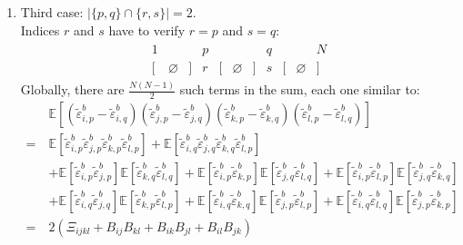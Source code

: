 \documentclass[12pt]{scrartcl}
\begin{document}
\begin{enumerate}
\item Third case: $|\{p,q\} \cap \{r,s\}| = 2$.\\
Indices $r$ and $s$ have to verify $r = p$ and $s = q$:
\begin{align}
\begin{array}{ccccccccccc}
1 & & & p & & & & q & & & N \\
\big[ & \varnothing & \big] & r & \big[ & \varnothing & \big] & s & \big[ & \varnothing & \big] \nonumber
\end{array}
\end{align}
Globally, there are $\displaystyle \frac{N(N-1)}{2}$ such terms in the sum, each one similar to:
\begin{align}
& \mathbb{E}\left[ \left(\widetilde{\varepsilon}^b_{i,p}-\widetilde{\varepsilon}^b_{i,q}\right)\left(\widetilde{\varepsilon}^b_{j,p}-\widetilde{\varepsilon}^b_{j,q}\right) \left(\widetilde{\varepsilon}^b_{k,p}-\widetilde{\varepsilon}^b_{k,q}\right)\left(\widetilde{\varepsilon}^b_{l,p}-\widetilde{\varepsilon}^b_{l,q}\right) \right] \nonumber \\
= \ & \mathbb{E} \left[\widetilde{\varepsilon}^b_{i,p} \widetilde{\varepsilon}^b_{j,p} \widetilde{\varepsilon}^b_{k,p} \widetilde{\varepsilon}^b_{l,p}\right] + \mathbb{E} \left[\widetilde{\varepsilon}^b_{i,q} \widetilde{\varepsilon}^b_{j,q} \widetilde{\varepsilon}^b_{k,q} \widetilde{\varepsilon}^b_{l,p}\right] \nonumber \\
& + \mathbb{E}\left[\widetilde{\varepsilon}^b_{i,p} \widetilde{\varepsilon}^b_{j,p}\right] \mathbb{E}\left[\widetilde{\varepsilon}^b_{k,q} \widetilde{\varepsilon}^b_{l,q}\right] + \mathbb{E}\left[\widetilde{\varepsilon}^b_{i,p} \widetilde{\varepsilon}^b_{k,p}\right] \mathbb{E}\left[\widetilde{\varepsilon}^b_{j,q} \widetilde{\varepsilon}^b_{l,q}\right] + \mathbb{E}\left[\widetilde{\varepsilon}^b_{i,p} \widetilde{\varepsilon}^b_{l,p}\right] \mathbb{E}\left[\widetilde{\varepsilon}^b_{j,q} \widetilde{\varepsilon}^b_{k,q}\right] \nonumber \\
& + \mathbb{E}\left[\widetilde{\varepsilon}^b_{i,q} \widetilde{\varepsilon}^b_{j,q}\right] \mathbb{E}\left[\widetilde{\varepsilon}^b_{k,p} \widetilde{\varepsilon}^b_{l,p}\right] + \mathbb{E}\left[\widetilde{\varepsilon}^b_{i,q} \widetilde{\varepsilon}^b_{k,q}\right] \mathbb{E}\left[\widetilde{\varepsilon}^b_{j,p} \widetilde{\varepsilon}^b_{l,p}\right] + \mathbb{E}\left[\widetilde{\varepsilon}^b_{i,q} \widetilde{\varepsilon}^b_{l,q}\right] \mathbb{E}\left[\widetilde{\varepsilon}^b_{j,p} \widetilde{\varepsilon}^b_{k,p}\right] \nonumber \\
= \ & 2 \left(\Xi_{ijkl} + B_{ij} B_{kl} + B_{ik} B_{jl} + B_{il} B_{jk}\right)
\end{align}
\end{enumerate}
\end{document}
